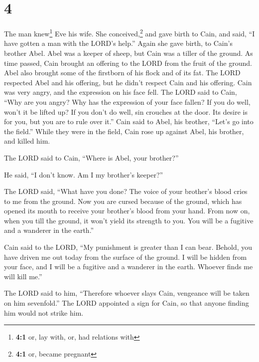 \hypertarget{section-3}{%
\section{4}\label{section-3}}

 The man knew\footnote{\textbf{4:1} or, lay with, or, had
  relations with} Eve his wife. She conceived,\footnote{\textbf{4:1} or,
  became pregnant} and gave birth to Cain, and said, ``I have gotten a
man with the LORD's help.''  Again she gave birth, to
Cain's brother Abel. Abel was a keeper of sheep, but Cain was a tiller
of the ground.  As time passed, Cain brought an offering
to the LORD from the fruit of the ground.  Abel also
brought some of the firstborn of his flock and of its fat. The LORD
respected Abel and his offering,  but he didn't respect
Cain and his offering. Cain was very angry, and the expression on his
face fell.  The LORD said to Cain, ``Why are you angry?
Why has the expression of your face fallen?  If you do
well, won't it be lifted up? If you don't do well, sin crouches at the
door. Its desire is for you, but you are to rule over it.''
 Cain said to Abel, his brother, ``Let's go into the
field.'' While they were in the field, Cain rose up against Abel, his
brother, and killed him.

 The LORD said to Cain, ``Where is Abel, your brother?''

He said, ``I don't know. Am I my brother's keeper?''

 The LORD said, ``What have you done? The voice of your
brother's blood cries to me from the ground.  Now you are
cursed because of the ground, which has opened its mouth to receive your
brother's blood from your hand.  From now on, when you
till the ground, it won't yield its strength to you. You will be a
fugitive and a wanderer in the earth.''

 Cain said to the LORD, ``My punishment is greater than I
can bear.  Behold, you have driven me out today from the
surface of the ground. I will be hidden from your face, and I will be a
fugitive and a wanderer in the earth. Whoever finds me will kill me.''

 The LORD said to him, ``Therefore whoever slays Cain,
vengeance will be taken on him sevenfold.'' The LORD appointed a sign
for Cain, so that anyone finding him would not strike him.

